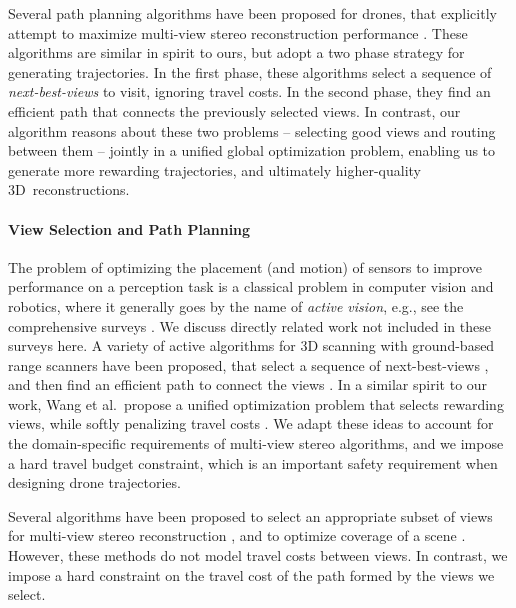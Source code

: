 Several path planning algorithms have been proposed for drones, that explicitly attempt to maximize multi-view stereo reconstruction performance \cite{dunn:2009a,hoppe:2012,mostegel:2016,schmid:2012}.
These algorithms are similar in spirit to ours, but adopt a two phase strategy for generating trajectories.
In the first phase, these algorithms select a sequence of \emph{next-best-views} to visit, ignoring travel costs.
In the second phase, they find an efficient path that connects the previously selected views.
In contrast, our algorithm reasons about these two problems -- selecting good views and routing between them -- jointly in a unified global optimization problem, enabling us to generate more rewarding trajectories, and ultimately higher-quality 3D\ reconstructions.

\vspace{-13pt}
\paragraph{View Selection and Path Planning}
The problem of optimizing the placement (and motion) of sensors to improve performance on a perception task is a classical problem in computer vision and robotics, where it generally goes by the name of \emph{active vision}, e.g., see the comprehensive surveys \cite{chen:2011,scott:2003,tarabanis:1995}.
We discuss directly related work not included in these surveys here.
A variety of active algorithms for 3D scanning with ground-based range scanners have been proposed, that select a sequence of next-best-views \cite{krainin:2011}, and then find an efficient path to connect the views \cite{fan:2016,wu:2014}.
In a similar spirit to our work, Wang et al.~propose a unified optimization problem that selects rewarding views, while softly penalizing travel costs \cite{wang:2007}.
We adapt these ideas to account for the domain-specific requirements of multi-view stereo algorithms, and we impose a hard travel budget constraint, which is an important safety requirement when designing drone trajectories.

Several algorithms have been proposed to select an appropriate subset of views for multi-view stereo reconstruction \cite{dunn:2009b,hornung:2008,mauro:2014b,mauro:2014a}, and to optimize coverage of a scene \cite{ghanem:2015,mavrinac:2013}.
However, these methods do not model travel costs between views.
In contrast, we impose a hard constraint on the travel cost of the path formed by the views we select.

\vspace{-14pt}
